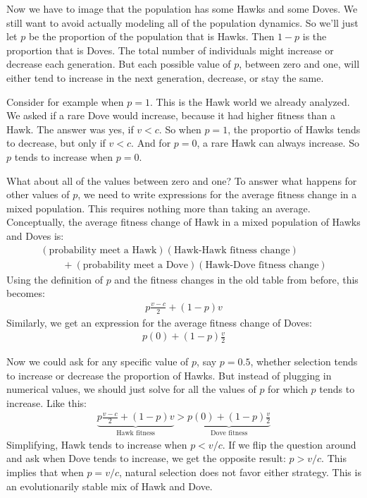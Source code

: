 \documentclass[10pt,reqno]{amsbook}
\numberwithin{equation}{chapter}
\begin{document}
Now we have to image that the population has some Hawks and some Doves. We still want to avoid actually modeling all of the population dynamics. So we'll just let $p$ be the proportion of the population that is Hawks. Then $1-p$ is the proportion that is Doves. The total number of individuals might increase or decrease each generation. But each possible value of $p$, between zero and one, will either tend to increase in the next generation, decrease, or stay the same.

Consider for example when $p=1$. This is the Hawk world we already analyzed. We asked if a rare Dove would increase, because it had higher fitness than a Hawk. The answer was yes, if $v<c$. So when $p=1$, the proportio of Hawks tends to decrease, but only if $v<c$. And for $p=0$, a rare Hawk can always increase. So $p$ tends to increase when $p=0$.

What about all of the values between zero and one? To answer what happens for other values of $p$, we need to write expressions for the average fitness change in a mixed population. This requires nothing more than taking an average. Conceptually, the average fitness change of Hawk in a mixed population of Hawks and Doves is:
\begin{align*}
	(\text{probability meet a Hawk})(\text{Hawk-Hawk fitness change}) \\
	~ \quad \quad + (\text{probability meet a Dove})(\text{Hawk-Dove fitness change})
\end{align*}
Using the definition of $p$ and the fitness changes in the old table from before, this becomes:
\begin{align*}
	p \frac{v-c}{2} + (1-p)v
\end{align*}
Similarly, we get an expression for the average fitness change of Doves:
\begin{align*}
	p (0) + (1-p)\frac{v}{2}
\end{align*}

Now we could ask for any specific value of $p$, say $p=0.5$, whether selection tends to increase or decrease the proportion of Hawks. But instead of plugging in numerical values, we should just solve for all the values of $p$ for which $p$ tends to increase. Like this:
\begin{align*}
	\underbrace{p \frac{v-c}{2} + (1-p)v}_{\text{Hawk fitness}} > \underbrace{p (0) + (1-p)\frac{v}{2} }_{\text{Dove fitness}}
\end{align*}
Simplifying, Hawk tends to increase when $p < v/c$. If we flip the question around and ask when Dove tends to increase, we get the opposite result: $p>v/c$. This implies that when $p=v/c$, natural selection does not favor either strategy. This is an evolutionarily stable mix of Hawk and Dove.
\end{document}

